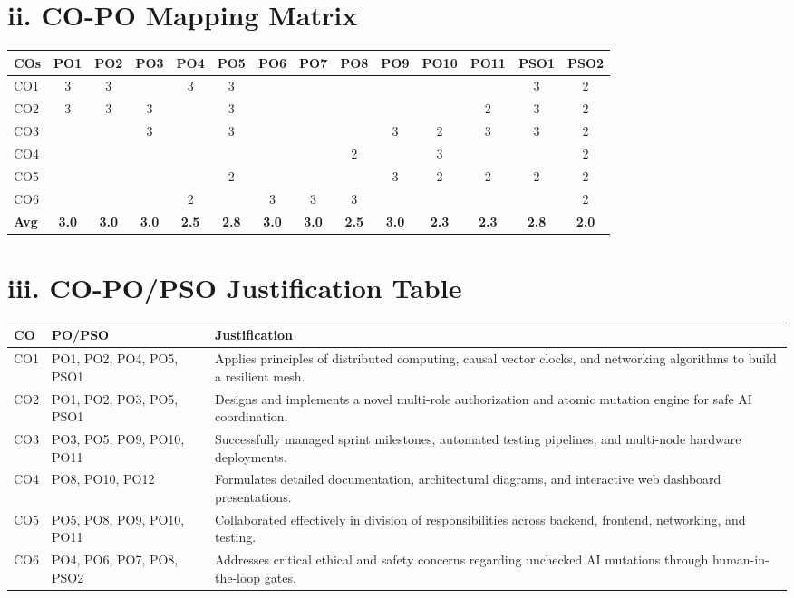 \documentclass[12pt,a4paper]{report}
\begin{document}
\section*{ii. CO-PO Mapping Matrix}
\begin{table}[H]
\centering
\small
\begin{tabular}{|l|c|c|c|c|c|c|c|c|c|c|c|c|c|}
\hline
\textbf{COs} & \textbf{PO1} & \textbf{PO2} & \textbf{PO3} & \textbf{PO4} & \textbf{PO5} & \textbf{PO6} & \textbf{PO7} & \textbf{PO8} & \textbf{PO9} & \textbf{PO10} & \textbf{PO11} & \textbf{PSO1} & \textbf{PSO2} \\
\hline
CO1 & 3 & 3 &   & 3 & 3 &   &   &   &   &    &    & 3 & 2 \\
CO2 & 3 & 3 & 3 &   & 3 &   &   &   &   &    & 2  & 3 & 2 \\
CO3 &   &   & 3 &   & 3 &   &   &   & 3 & 2  & 3  & 3 & 2 \\
CO4 &   &   &   &   &   &   &   & 2 &   & 3  &    &   & 2 \\
CO5 &   &   &   &   & 2 &   &   &   & 3 & 2  & 2  & 2 & 2 \\
CO6 &   &   &   & 2 &   & 3 & 3 & 3 &   &    &    &   & 2 \\
\hline
\textbf{Avg} & \textbf{3.0} & \textbf{3.0} & \textbf{3.0} & \textbf{2.5} & \textbf{2.8} & \textbf{3.0} & \textbf{3.0} & \textbf{2.5} & \textbf{3.0} & \textbf{2.3} & \textbf{2.3} & \textbf{2.8} & \textbf{2.0} \\
\hline
\end{tabular}
\end{table}

\section*{iii. CO-PO/PSO Justification Table}
\begin{tabularx}{\textwidth}{|l|l|X|}
\hline
\textbf{CO} & \textbf{PO/PSO} & \textbf{Justification} \\
\hline
CO1 & PO1, PO2, PO4, PO5, PSO1 & Applies principles of distributed computing, causal vector clocks, and networking algorithms to build a resilient mesh. \\
CO2 & PO1, PO2, PO3, PO5, PSO1 & Designs and implements a novel multi-role authorization and atomic mutation engine for safe AI coordination. \\
CO3 & PO3, PO5, PO9, PO10, PO11 & Successfully managed sprint milestones, automated testing pipelines, and multi-node hardware deployments. \\
CO4 & PO8, PO10, PO12 & Formulates detailed documentation, architectural diagrams, and interactive web dashboard presentations. \\
CO5 & PO5, PO8, PO9, PO10, PO11 & Collaborated effectively in division of responsibilities across backend, frontend, networking, and testing. \\
CO6 & PO4, PO6, PO7, PO8, PSO2 & Addresses critical ethical and safety concerns regarding unchecked AI mutations through human-in-the-loop gates. \\
\hline
\end{tabularx}
\end{document}
